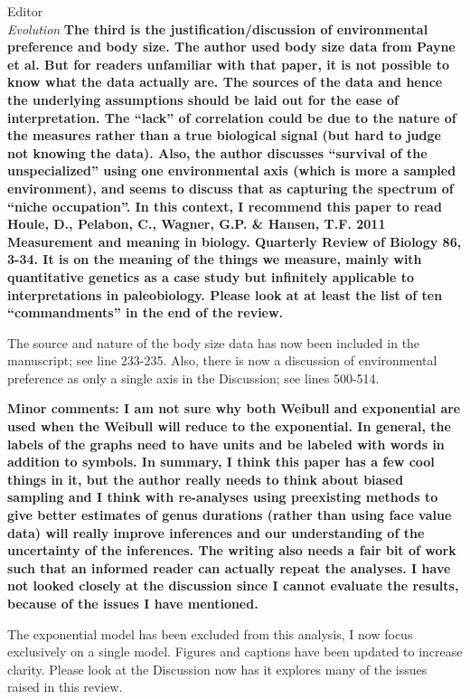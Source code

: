 \documentclass{letter}
\begin{document}
\begin{letter}{Editor \\ \textit{Evolution}}
  \textbf{The third is the justification/discussion of environmental preference and body size. The author used body size data from Payne et al. But for readers unfamiliar with that paper, it is not possible to know what the data actually are. The sources of the data and hence the underlying assumptions should be laid out for the ease of interpretation. The “lack” of correlation could be due to the nature of the measures rather than a true biological signal (but hard to judge not knowing the data). Also, the author discusses “survival of the unspecialized” using one environmental axis (which is more a sampled environment), and seems to discuss that as capturing the spectrum of “niche occupation”. In this context, I recommend this paper to read Houle, D., Pelabon, C., Wagner, G.P. \& Hansen, T.F. 2011 Measurement and meaning in biology. Quarterly Review of Biology 86, 3-34. It is on the meaning of the things we measure, mainly with quantitative genetics as a case study but infinitely applicable to interpretations in paleobiology. Please look at at least the list of ten “commandments” in the end of the review. }

  The source and nature of the body size data has now been included in the manuscript; see line 233-235. Also, there is now a discussion of environmental preference as only a single axis in the Discussion; see lines 500-514.

  
  \textbf{Minor comments: I am not sure why both Weibull and exponential are used when the Weibull will reduce to the exponential. In general, the labels of the graphs need to have units and be labeled with words in addition to symbols. In summary, I think this paper has a few cool things in it, but the author really needs to think about biased sampling and I think with re-analyses using preexisting methods to give better estimates of genus durations (rather than using face value data) will really improve inferences and our understanding of the uncertainty of the inferences. The writing also needs a fair bit of work such that an informed reader can actually repeat the analyses. I have not looked closely at the discussion since I cannot evaluate the results, because of the issues I have mentioned. }
  
  The exponential model has been excluded from this analysis, I now focus exclusively on a single model. Figures and captions have been updated to increase clarity. Please look at the Discussion now has it explores many of the issues raised in this review.



\end{letter}


\end{document}
